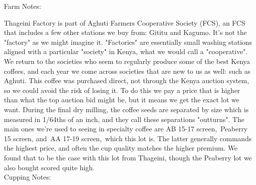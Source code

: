\documentclass[10pt,twoside,footinclude=true,headinclude=true]{scrbook} %
\newlength{\mysize}
\newcommand{\myfontsize}[1]{
  \setlength{\mysize}{#1pt}
  \fontsize{\mysize}{1.2\mysize}
  \selectfont
}
\begin{document}

\newpage
\vspace*{-2.2em}
\raggedright
\normalsize
Farm Notes: \\
\myfontsize{8}
Thageini Factory is part of Aghuti Farmers Cooperative Society (FCS), an FCS that includes a few other stations we buy from: Gititu and Kagumo. It's not the "factory" as we might imagine it. "Factories" are essentially small washing stations aligned with a particular "society" in Kenya, what we would call a "cooperative". We return to the societies who seem to regularly produce some of the best Kenya coffees, and each year we come across societies that are new to us as well: such as Aghuti. This coffee was purchased direct, not through the Kenya auction system, so we could avoid the risk of losing it. To do this we pay a price that is higher than what the top auction bid might be, but it means we get the exact lot we want. During the final dry milling, the coffee seeds are separated by size which is measured in 1/64ths of an inch, and they call these separations "outturns". The main ones we're used to seeing in specialty coffee are AB 15-17 screen, Peaberry 15 screen, and AA 17-19 screen, which this lot is. The latter generally commands the highest price, and often the cup quality matches the higher premium. We found that to be the case with this lot from Thageini, though the Peaberry lot we also bought scored quite high. \\
\medskip
\normalsize
Cupping Notes: \\
\myfontsize{8}
\end{document}

